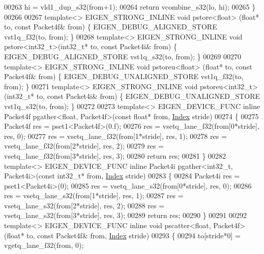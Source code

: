 \begin{DoxyCode}
{{00263   hi = vld1\_dup\_s32(from+1);
00264   \textcolor{keywordflow}{return} vcombine\_s32(lo, hi);
00265 \}
00266 
00267 \textcolor{keyword}{template}<> EIGEN\_STRONG\_INLINE \textcolor{keywordtype}{void} pstore<float>  (\textcolor{keywordtype}{float}*    to, \textcolor{keyword}{const} Packet4f& from) \{ 
      EIGEN\_DEBUG\_ALIGNED\_STORE vst1q\_f32(to, from); \}
00268 \textcolor{keyword}{template}<> EIGEN\_STRONG\_INLINE \textcolor{keywordtype}{void} pstore<int32\_t>(int32\_t*  to, \textcolor{keyword}{const} Packet4i& from) \{ 
      EIGEN\_DEBUG\_ALIGNED\_STORE vst1q\_s32(to, from); \}
00269 
00270 \textcolor{keyword}{template}<> EIGEN\_STRONG\_INLINE \textcolor{keywordtype}{void} pstoreu<float>  (\textcolor{keywordtype}{float}*   to, \textcolor{keyword}{const} Packet4f& from) \{ 
      EIGEN\_DEBUG\_UNALIGNED\_STORE vst1q\_f32(to, from); \}
00271 \textcolor{keyword}{template}<> EIGEN\_STRONG\_INLINE \textcolor{keywordtype}{void} pstoreu<int32\_t>(int32\_t* to, \textcolor{keyword}{const} Packet4i& from) \{ 
      EIGEN\_DEBUG\_UNALIGNED\_STORE vst1q\_s32(to, from); \}
00272 
00273 \textcolor{keyword}{template}<> EIGEN\_DEVICE\_FUNC \textcolor{keyword}{inline} Packet4f pgather<float, Packet4f>(\textcolor{keyword}{const} \textcolor{keywordtype}{float}* from, 
      \hyperlink{namespace_eigen_a62e77e0933482dafde8fe197d9a2cfde}{Index} stride)
00274 \{
00275   Packet4f res = pset1<Packet4f>(0.f);
00276   res = vsetq\_lane\_f32(from[0*stride], res, 0);
00277   res = vsetq\_lane\_f32(from[1*stride], res, 1);
00278   res = vsetq\_lane\_f32(from[2*stride], res, 2);
00279   res = vsetq\_lane\_f32(from[3*stride], res, 3);
00280   \textcolor{keywordflow}{return} res;
00281 \}
00282 \textcolor{keyword}{template}<> EIGEN\_DEVICE\_FUNC \textcolor{keyword}{inline} Packet4i pgather<int32\_t, Packet4i>(\textcolor{keyword}{const} int32\_t* from, 
      \hyperlink{namespace_eigen_a62e77e0933482dafde8fe197d9a2cfde}{Index} stride)
00283 \{
00284   Packet4i res = pset1<Packet4i>(0);
00285   res = vsetq\_lane\_s32(from[0*stride], res, 0);
00286   res = vsetq\_lane\_s32(from[1*stride], res, 1);
00287   res = vsetq\_lane\_s32(from[2*stride], res, 2);
00288   res = vsetq\_lane\_s32(from[3*stride], res, 3);
00289   \textcolor{keywordflow}{return} res;
00290 \}
00291 
00292 \textcolor{keyword}{template}<> EIGEN\_DEVICE\_FUNC \textcolor{keyword}{inline} \textcolor{keywordtype}{void} pscatter<float, Packet4f>(\textcolor{keywordtype}{float}* to, \textcolor{keyword}{const} Packet4f& from, 
      \hyperlink{namespace_eigen_a62e77e0933482dafde8fe197d9a2cfde}{Index} stride)
00293 \{
00294   to[stride*0] = vgetq\_lane\_f32(from, 0);
}}
\end{DoxyCode}
